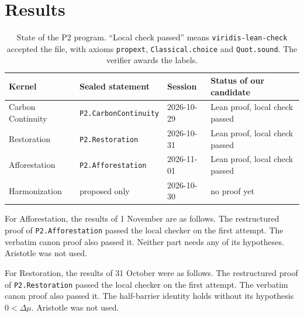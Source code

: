 \documentclass[11pt]{article}
\theoremstyle{definition}
\theoremstyle{remark}
\begin{document}
\section{Results}
\begin{table}[h]
\centering\small
\begin{tabular}{@{}llll@{}}
\toprule
Kernel & Sealed statement & Session & Status of our candidate \\
\midrule
Carbon Continuity & \texttt{P2.CarbonContinuity} & 2026-10-29 & Lean proof, local check passed \\
Restoration & \texttt{P2.Restoration} & 2026-10-31 & Lean proof, local check passed \\
Afforestation & \texttt{P2.Afforestation} & 2026-11-01 & Lean proof, local check passed \\
Harmonization & proposed only & 2026-10-30 & no proof yet \\
\bottomrule
\end{tabular}
\caption{State of the P2 program. ``Local check passed'' means \texttt{viridis-lean-check} accepted the file, with axioms
\texttt{propext}, \texttt{Classical.choice} and \texttt{Quot.sound}. The verifier awards the labels.}
\end{table}
For Afforestation, the results of 1 November are as follows.
The restructured proof of \texttt{P2.Afforestation} passed the local checker on the first attempt.
The verbatim canon proof also passed it. Neither part needs any of its hypotheses.
Aristotle was not used.

For Restoration, the results of 31 October were as follows.
The restructured proof of \texttt{P2.Restoration} passed the local checker on the first attempt.
The verbatim canon proof also passed it.
The half-barrier identity holds without its hypothesis $0<\Delta\mu$.
Aristotle was not used.
\end{document}
